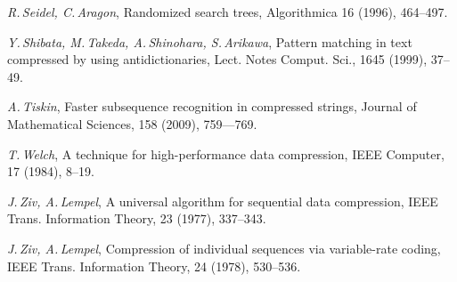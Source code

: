 ﻿\documentclass[11pt]{article}
\theoremstyle{remark}
\begin{document}
\begin{thebibliography}{99}
\textsl{R.\,Seidel, C.\,Aragon}, Randomized search trees, Algorithmica 16 (1996), 464--497.

\textsl{Y.\,Shibata, M.\,Takeda, A.\,Shinohara, S.\,Arikawa}, Pattern matching in text compressed by using
antidictionaries, Lect. Notes Comput. Sci., 1645 (1999), 37--49.

\textsl{A.\,Tiskin}, Faster subsequence recognition in compressed strings, Journal of Mathematical Sciences, 158 (2009),
759—769.

\textsl{T.\,Welch}, A technique for high-performance data compression, IEEE Computer, 17 (1984), 8--19.

\textsl{J.\,Ziv, A.\,Lempel}, A universal algorithm for sequential data compression, IEEE Trans. Information Theory, 23 (1977), 337--343.

\textsl{J.\,Ziv, A.\,Lempel}, Compression of individual sequences via variable-rate coding, IEEE Trans. Information Theory, 24 (1978),
530--536.

\end{thebibliography}
\end{document}

